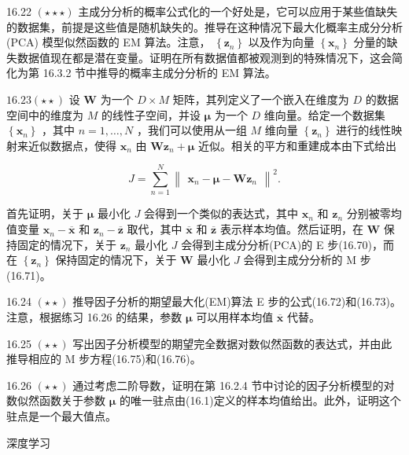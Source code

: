 \documentclass[10pt]{report}
\begin{document}
16.22 \(\left( {\star  \star   \star  }\right)\) 主成分分析的概率公式化的一个好处是，它可以应用于某些值缺失的数据集，前提是这些值是随机缺失的。推导在这种情况下最大化概率主成分分析 (PCA) 模型似然函数的 EM 算法。注意， \(\left\{  {\mathbf{z}}_{n}\right\}\) 以及作为向量 \(\left\{  {\mathbf{x}}_{n}\right\}\) 分量的缺失数据值现在都是潜在变量。证明在所有数据值都被观测到的特殊情况下，这会简化为第 16.3.2 节中推导的概率主成分分析的 EM 算法。

\({16.23}\left( {\star  \star  }\right)\) 设 \(\mathbf{W}\) 为一个 \(D \times  M\) 矩阵，其列定义了一个嵌入在维度为 \(D\) 的数据空间中的维度为 \(M\) 的线性子空间，并设 \(\mathbf{\mu }\) 为一个 \(D\) 维向量。给定一个数据集 \(\left\{  {\mathbf{x}}_{n}\right\}\) ，其中 \(n = 1,\ldots ,N\) ，我们可以使用从一组 \(M\) 维向量 \(\left\{  {\mathbf{z}}_{n}\right\}\) 进行的线性映射来近似数据点，使得 \({\mathbf{x}}_{n}\) 由 \(\mathbf{W}{\mathbf{z}}_{n} + \mathbf{\mu }\) 近似。相关的平方和重建成本由下式给出

\[
J = \mathop{\sum }\limits_{{n = 1}}^{N}{\begin{Vmatrix}{\mathbf{x}}_{n} - \mathbf{\mu } - \mathbf{W}{\mathbf{z}}_{n}\end{Vmatrix}}^{2}. \tag{16.90}
\]

首先证明，关于 \(\mathbf{\mu }\) 最小化 \(J\) 会得到一个类似的表达式，其中 \({\mathbf{x}}_{n}\) 和 \({\mathbf{z}}_{n}\) 分别被零均值变量 \({\mathbf{x}}_{n} - \overline{\mathbf{x}}\) 和 \({\mathbf{z}}_{n} - \overline{\mathbf{z}}\) 取代，其中 \(\overline{\mathbf{x}}\) 和 \(\overline{\mathbf{z}}\) 表示样本均值。然后证明，在 \(\mathbf{W}\) 保持固定的情况下，关于 \({\mathbf{z}}_{n}\) 最小化 \(J\) 会得到主成分分析(PCA)的 E 步(16.70)，而在 \(\left\{  {\mathbf{z}}_{n}\right\}\) 保持固定的情况下，关于 \(\mathbf{W}\) 最小化 \(J\) 会得到主成分分析的 M 步(16.71)。

16.24 \(\left( {\star  \star  }\right)\) 推导因子分析的期望最大化(EM)算法 E 步的公式(16.72)和(16.73)。注意，根据练习 16.26 的结果，参数 \(\mathbf{\mu }\) 可以用样本均值 \(\overline{\mathbf{x}}\) 代替。

16.25 \(\left( {\star  \star  }\right)\) 写出因子分析模型的期望完全数据对数似然函数的表达式，并由此推导相应的 M 步方程(16.75)和(16.76)。

16.26 \(\left( {\star  \star  }\right)\) 通过考虑二阶导数，证明在第 16.2.4 节中讨论的因子分析模型的对数似然函数关于参数 \(\mathbf{\mu }\) 的唯一驻点由(16.1)定义的样本均值给出。此外，证明这个驻点是一个最大值点。

深度学习
\end{document}
